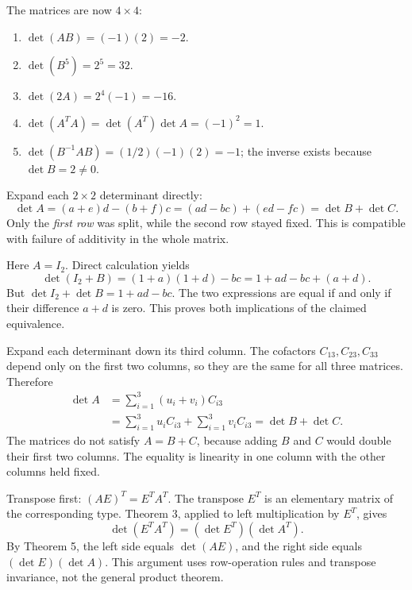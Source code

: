 The matrices are now $4\times4$:
\begin{enumerate}[label=(\alph*)]
\item $\det(AB)=(-1)(2)=-2$.
\item $\det(B^5)=2^5=32$.
\item $\det(2A)=2^4(-1)=-16$.
\item $\det(A^TA)=\det(A^T)\det A=(-1)^2=1$.
\item $\det(B^{-1}AB)=(1/2)(-1)(2)=-1$; the inverse exists because $\det B=2\ne0$.
\end{enumerate}

Expand each $2\times2$ determinant directly:
\[
\det A=(a+e)d-(b+f)c=(ad-bc)+(ed-fc)=\det B+\det C.
\]
Only the \emph{first row} was split, while the second row stayed fixed. This is compatible with failure of additivity in the whole matrix.

Here $A=I_2$. Direct calculation yields
\[
\det(I_2+B)=(1+a)(1+d)-bc=1+ad-bc+(a+d).
\]
But $\det I_2+\det B=1+ad-bc$. The two expressions are equal if and only if their difference $a+d$ is zero. This proves both implications of the claimed equivalence.

Expand each determinant down its third column. The cofactors $C_{13},C_{23},C_{33}$ depend only on the first two columns, so they are the same for all three matrices. Therefore
\begin{align*}
\det A&=\sum_{i=1}^3(u_i+v_i)C_{i3}\\
&=\sum_{i=1}^3u_iC_{i3}+\sum_{i=1}^3v_iC_{i3}
=\det B+\det C.
\end{align*}
The matrices do not satisfy $A=B+C$, because adding $B$ and $C$ would double their first two columns. The equality is linearity in one column with the other columns held fixed.

Transpose first: $(AE)^T=E^TA^T$. The transpose $E^T$ is an elementary matrix of the corresponding type. Theorem 3, applied to left multiplication by $E^T$, gives
\[
\det(E^TA^T)=(\det E^T)(\det A^T).
\]
By Theorem 5, the left side equals $\det(AE)$, and the right side equals $(\det E)(\det A)$. This argument uses row-operation rules and transpose invariance, not the general product theorem.

